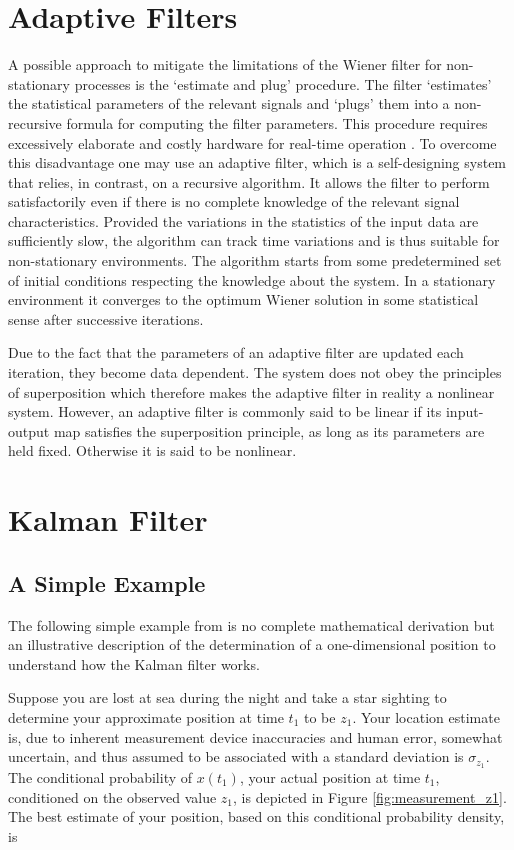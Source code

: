 \section{Adaptive Filters}

A possible approach to mitigate the limitations of the Wiener filter for non-stationary processes is the `estimate and plug' procedure. The filter `estimates' the statistical parameters of the relevant signals and `plugs' them into a non-recursive formula for computing the filter parameters. This procedure requires excessively elaborate and costly hardware for real-time operation \cite{haykin2002adaptive}. To overcome this disadvantage one may use an adaptive filter, which is a self-designing system that relies, in contrast, on a recursive algorithm. It allows the filter to perform satisfactorily even if there is no complete knowledge of the relevant signal characteristics. Provided the variations in the  statistics of the input data are sufficiently slow, the algorithm can track time variations and is thus suitable for non-stationary environments. The algorithm starts from some predetermined set of initial conditions respecting the knowledge about the system. In a stationary environment it converges to the optimum Wiener solution in some statistical sense after successive iterations.

Due to the fact that the parameters of an adaptive filter are updated each iteration, they become data dependent. The system does not obey the principles of superposition which therefore makes the adaptive filter in reality a nonlinear system. However, an adaptive filter is commonly said to be linear if its input-output map satisfies the superposition principle, as long as its parameters are held fixed. Otherwise it is said to be nonlinear.


\section{Kalman Filter}

\subsection{A Simple Example}

The following simple example from \citeauthor{Maybeck79} \cite{Maybeck79} is no complete mathematical derivation but an illustrative description of the determination of a one-dimensional position to understand how the Kalman filter works.

Suppose you are lost at sea during the night and take a star sighting to determine your approximate position at time $t_1$ to be $z_1$. Your location estimate is, due to inherent measurement device inaccuracies and human error, somewhat uncertain, and thus assumed to be associated with a standard deviation is $\sigma_{z_1}$. The conditional probability of $x(t_1)$, your actual position at time $t_1$, conditioned on the observed value $z_1$, is depicted in Figure \ref{fig:measurement_z1}. The best estimate of your position, based on this conditional probability density, is

